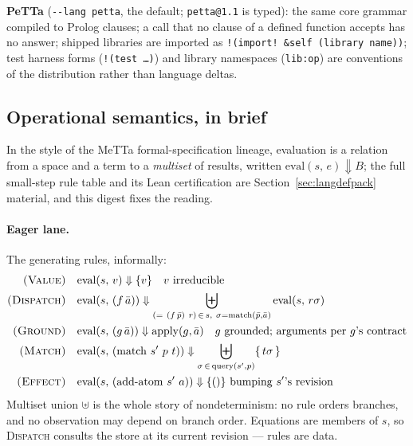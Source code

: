 \documentclass[11pt]{article}
\newcommand{\eval}[2]{\mathrm{eval}(#1,\,#2)}
\newcommand{\code}[1]{\texttt{#1}}
\newcommand{\PeTTa}{\textup{PeTTa}}
\begin{document}
\textbf{\PeTTa{}} (\code{-{}-lang petta}, the default; \code{petta@1.1} is
typed): the same core grammar compiled to Prolog clauses; a call that no
clause of a defined function accepts has no answer; shipped libraries are
imported as \code{!(import!\ \&self (library name))}; test harness forms
(\code{!(test \dots)}) and library namespaces (\code{lib:op}) are
conventions of the distribution rather than language deltas.

\subsection{Operational semantics, in brief}

In the style of the MeTTa formal-specification lineage, evaluation is a
relation from a space and a term to a \emph{multiset} of results,
written $\eval{s}{e} \Downarrow B$; the full small-step rule table and
its Lean certification are Section~\ref{sec:langdefpack} material, and
this digest fixes the reading.

\paragraph{Eager lane.}  The generating rules, informally:
\begin{align*}
\textsc{(Value)}\quad & \eval{s}{v} \Downarrow \{v\}
  \quad\text{$v$ irreducible} \\
\textsc{(Dispatch)}\quad & \eval{s}{(f\,\bar a)} \Downarrow
  \biguplus_{(=\ (f\,\bar p)\ r)\,\in\, s,\ \sigma = \mathrm{match}(\bar p, \bar a)}
  \eval{s}{r\sigma} \\
\textsc{(Ground)}\quad & \eval{s}{(g\,\bar a)} \Downarrow \mathrm{apply}(g, \bar a)
  \quad\text{$g$ grounded; arguments per $g$'s contract} \\
\textsc{(Match)}\quad & \eval{s}{(\mathrm{match}\ s'\ p\ t)} \Downarrow
  \biguplus_{\sigma \,\in\, \mathrm{query}(s', p)} \{\,t\sigma\,\} \\
\textsc{(Effect)}\quad & \eval{s}{(\mathrm{add\text{-}atom}\ s'\ a)}
  \Downarrow \{()\} \ \text{bumping $s'$'s revision}
\end{align*}
Multiset union $\uplus$ is the whole story of nondeterminism: no rule
orders branches, and no observation may depend on branch order.
Equations are members of $s$, so \textsc{Dispatch} consults the store
at its current revision --- rules are data.
\end{document}

